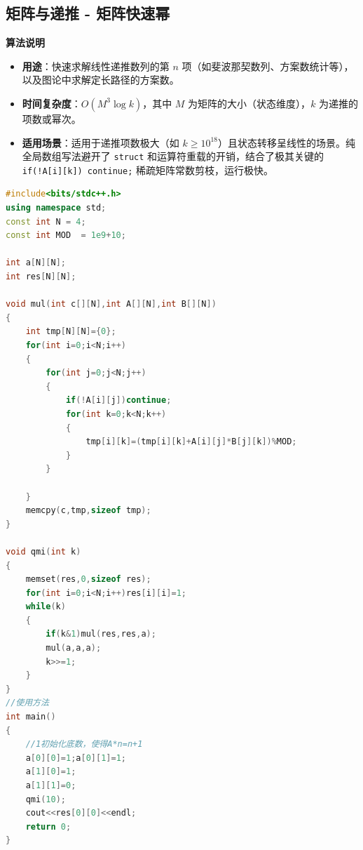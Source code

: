 \documentclass[10pt,landscape,a4paper]{article}
\begin{document}
\begin{multicols*}{3}
\subsection*{矩阵与递推 - 矩阵快速幂}
\par\addvspace{0.7ex}\noindent\textbf{算法说明}\par\nobreak
\begin{itemize}
\item \textbf{用途}：快速求解线性递推数列的第 $n$ 项（如斐波那契数列、方案数统计等），以及图论中求解定长路径的方案数。
\item \textbf{时间复杂度}：$O(M^3 \log k)$，其中 $M$ 为矩阵的大小（状态维度），$k$ 为递推的项数或幂次。
\item \textbf{适用场景}：适用于递推项数极大（如 $k \ge 10^{18}$）且状态转移呈线性的场景。纯全局数组写法避开了 \texttt{s\allowbreak{}t\allowbreak{}r\allowbreak{}u\allowbreak{}c\allowbreak{}t} 和运算符重载的开销，结合了极其关键的 \texttt{i\allowbreak{}f\allowbreak{}(\allowbreak{}!\allowbreak{}A\allowbreak{}[\allowbreak{}i\allowbreak{}]\allowbreak{}[\allowbreak{}k\allowbreak{}]\allowbreak{})\allowbreak{} \allowbreak{}c\allowbreak{}o\allowbreak{}n\allowbreak{}t\allowbreak{}i\allowbreak{}n\allowbreak{}u\allowbreak{}e\allowbreak{};} 稀疏矩阵常数剪枝，运行极快。
\end{itemize}
\par{}\par
\begin{lstlisting}[language=C++]
#include<bits/stdc++.h>
using namespace std;
const int N = 4;
const int MOD  = 1e9+10;

int a[N][N];
int res[N][N];

void mul(int c[][N],int A[][N],int B[][N])
{
    int tmp[N][N]={0};
    for(int i=0;i<N;i++)
    {
        for(int j=0;j<N;j++)
        {
            if(!A[i][j])continue;
            for(int k=0;k<N;k++)
            {
                tmp[i][k]=(tmp[i][k]+A[i][j]*B[j][k])%MOD;
            }
        }
        
    }
    memcpy(c,tmp,sizeof tmp);
}

void qmi(int k)
{
    memset(res,0,sizeof res);
    for(int i=0;i<N;i++)res[i][i]=1;
    while(k)
    {
        if(k&1)mul(res,res,a);
        mul(a,a,a);
        k>>=1;
    }
}
//使用方法
int main()
{
    //1初始化底数，使得A*n=n+1
    a[0][0]=1;a[0][1]=1;
    a[1][0]=1;
    a[1][1]=0;
    qmi(10);
    cout<<res[0][0]<<endl;
    return 0;
}
\end{lstlisting}

\end{multicols*}
\end{document}

